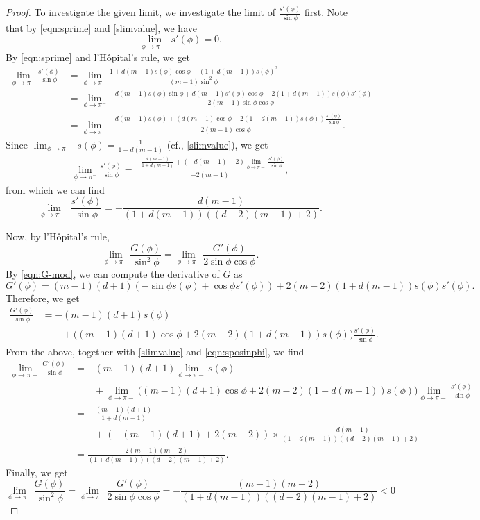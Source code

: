 \documentclass[11pt]{amsart}
\newcommand{\dm}{d} %
\begin{document}
\begin{proof}
To investigate the given limit, we investigate the limit of $\frac{s'(\phi)}{\sin\phi}$ first. Note that by \eqref{eqn:sprime} and \eqref{slimvalue}, we have
\[
\lim_{\phi\to\pi-}s'(\phi)=0.
\]
By \eqref{eqn:sprime} and l'H\^{o}pital's rule, we get
\begin{align*}
\lim_{\phi\to\pi^-}\frac{s'(\phi)}{\sin\phi}
&=\lim_{\phi\to\pi^-}\frac{1+\dm(m-1) s(\phi) \cos\phi -(1+\dm(m-1))s(\phi)^2}{
(m-1)\sin^2\phi}\\
&=\lim_{\phi\to\pi^-}
\frac{ -\dm(m-1)s(\phi) \sin\phi + \dm(m-1) s'(\phi) \cos\phi -2(1+\dm(m-1))s(\phi)s'(\phi)}{2(m-1)\sin\phi\cos\phi}\\
&=\lim_{\phi\to\pi^-}\frac{-\dm(m-1)s(\phi)+\left(
\dm(m-1)\cos\phi-2(1+\dm(m-1))s(\phi)\right)\frac{s'(\phi)}{\sin\phi}}{
2(m-1)\cos\phi}.
\end{align*}
Since $\lim_{\phi\to\pi-}s(\phi)=\frac{1}{1+\dm(m-1)}$ (cf., \eqref{slimvalue}), we get
\begin{align*}
\lim_{\phi\to\pi^-}\frac{s'(\phi)}{\sin\phi}=\frac{-\frac{\dm(m-1)}{1+\dm(m-1)}+\left(-\dm(m-1)-2\right)\lim_{\phi\to\pi-}\frac{s'(\phi)}{\sin\phi}}{-2(m-1)},
\end{align*}
from which we can find 
\begin{equation}
\label{eqn:sposinphi}
\lim_{\phi\to\pi-}\frac{s'(\phi)}{\sin\phi}=-\frac{\dm(m-1)}{\left(1+\dm(m-1)\right)\left((\dm-2)(m-1)+2\right)}.
\end{equation}

Now, by l'H\^{o}pital's rule,
\[
\lim_{\phi\to\pi^-}\frac{G(\phi)}{\sin^2\phi}=\lim_{\phi\to\pi^-}
\frac{G'(\phi)}{2\sin\phi\cos\phi}.
\]
By \eqref{eqn:G-mod}, we can compute the derivative of $G$ as
\[
G'(\phi)=(m-1)(\dm+1)\left(-\sin\phi s(\phi)+\cos\phi s'(\phi)\right)
+2(m-2)(1+d(m-1))s(\phi)s'(\phi).
\]
Therefore, we get
\begin{align*}
\frac{G'(\phi)}{\sin\phi}&=-(m-1)(\dm+1)s(\phi)\\
&\qquad+\bigg((m-1)(\dm+1)\cos\phi+2(m-2)(1+\dm(m-1))s(\phi)\bigg)\frac{s'(\phi)}{\sin\phi}.
\end{align*}
From the above, together with \eqref{slimvalue} and \eqref{eqn:sposinphi}, we find
\begin{align*}
\lim_{\phi\to\pi-}\frac{G'(\phi)}{\sin\phi}&=-(m-1)(\dm+1)\lim_{\phi\to\pi-}s(\phi)\\
&\qquad+\lim_{\phi\to\pi-}\bigg((m-1)(\dm+1)\cos\phi+2(m-2)(1+\dm(m-1))s(\phi)\bigg)\lim_{\phi\to\pi-}\frac{s'(\phi)}{\sin\phi}\\
&=-\frac{(m-1)(\dm+1)}{1+\dm(m-1)}\\
&\qquad+\left(-(m-1)(\dm+1)+2(m-2)\right)\times \frac{-\dm(m-1)}{\left(1+\dm(m-1)\right)\left((\dm-2)(m-1)+2\right)}\\
&=\frac{2(m-1)(m-2)}{(1+\dm(m-1))((\dm-2)(m-1)+2)}.
\end{align*}
Finally, we get
\[
\lim_{\phi\to\pi^-}\frac{G(\phi)}{\sin^2\phi}=\lim_{\phi\to\pi^-}
\frac{G'(\phi)}{2\sin\phi\cos\phi}=-\frac{(m-1)(m-2)}{(1+\dm(m-1))((\dm-2)(m-1)+2)}<0
\]
\end{proof}



\def\url#1{}

\end{document}
